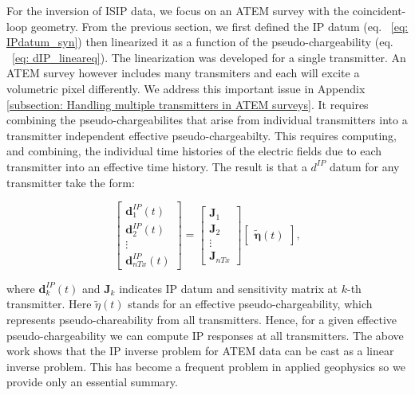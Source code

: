 \documentclass[extra,mreferee]{gji}
\newcommand{\peta}{\tilde{\eta}}
\newcommand{\dip}{d^{IP}}
\begin{document}
For the inversion of ISIP data, we focus on an ATEM survey with the coincident-loop geometry.
From the previous section, we first defined the IP datum (eq. ~\ref{eq: IPdatum_syn}) then linearized it as a function of the pseudo-chargeability (eq. ~\ref{eq: dIP_lineareq}). The linearization was developed for a single transmitter. An ATEM survey however includes many transmiters and each will excite a volumetric pixel differently. We address this important issue in Appendix \ref{subsection: Handling multiple transmitters in ATEM surveys}. It requires combining the pseudo-chargeabilites that arise from individual transmitters into a transmitter independent effective pseudo-chargeabilty. This requires computing, and combining, the individual time histories of the electric fields due to each transmitter into an effective time history. The result is that a $\dip$ datum for any transmitter take the form:
\begin{linenomath*}
\begin{equation}
  \left[ \begin{array}{c} \mathbf{d}^{IP}_1(t) \\ \mathbf{d}^{IP}_2(t) \\ \vdots \\  
  \mathbf{d}^{IP}_{nTx}(t) \end{array} \right] = \left[\begin{array}{c} \mathbf{J}_1 \\ \mathbf{J}_2 \\ \vdots \\  \mathbf{J}_{nTx} \end{array}\right] \left[ \begin{array}{c} \mathbf{\peta}(t) \end{array} \right],
\end{equation}
\end{linenomath*}
where $\mathbf{d}^{IP}_k (t)$ and $\mathbf{J}_k$ indicates IP datum and sensitivity matrix at $k$-th transmitter. Here $\peta(t)$ stands for an effective pseudo-chargeability, which represents pseudo-chareability from all transmitters. Hence, for a given effective pseudo-chargeability we can compute IP responses at all transmitters.  
The above work shows that the IP inverse problem for ATEM data can be cast as a linear inverse problem. This has become a frequent problem in applied geophysics so we provide only an essential summary. 


\end{document}
